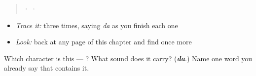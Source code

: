 \begin{quote}
  ·    ·  
\end{quote}

\begin{itemize}
\raggedright
  \item \emph{Trace it:}  three times, saying \emph{da} as you finish each one
  \item \emph{Look:} back at any page of this chapter and find  once more
\end{itemize}

\begin{tcolorbox}[breakable,colback=teal!4,colframe=teal!35!black,title={Before you move on}]
Which character is this — ? What sound does it carry? (\emph{\textbf{da}}.) Name one word you already say that contains it.
\end{tcolorbox}
